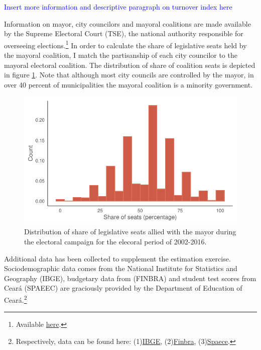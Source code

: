 \documentclass[12pt,a4paper]{article}
\newcommand{\blue}{\textcolor{blue}}
\begin{document}
\blue{Insert more information and descriptive paragraph on turnover index here}

Information on mayor, city councilors and mayoral coalitions are made available by the Supreme Electoral Court (TSE), the national authority responsible for overseeing elections.\footnote{Available \hyperlink{http://www.tse.jus.br/eleicoes/estatisticas/repositorio-de-dados-eleitorais-1}{here}.} In order to calculate the share of legislative seats held by the mayoral coalition, I match the partisanship of each city councilor to the mayoral electoral coalition. The distribution of share of coalition seats is depicted in figure \ref{fig:hist_coalition}. Note that although most city councils are controlled by the mayor, in over 40 percent of municipalities the mayoral coalition is a minority government.

\begin{figure}
    \centering
    \includegraphics{plots/hist_coalition.pdf}
    \caption{Distribution of share of legislative seats allied with the mayor during the electoral campaign for the elecoral period of 2002-2016.}
    \label{fig:hist_coalition}
\end{figure}

Additional data has been collected to supplement the estimation exercise. Sociodemographic data comes from the National Institute for Statistics and Geography (IBGE), budgetary data from (FINBRA) and student test scores from Ceará (SPAEEC) are graciously provided by the Department of Education of Ceará.\footnote{Respectively, data can be found here: (1)\hyperlink{https://ces.ibge.gov.br/base-de-dados/links-base-de-dados.html}{IBGE}, (2)\hyperlink{https://siconfi.tesouro.gov.br/siconfi/pages/public/consulta_finbra/finbra_list.jsf}{Finbra}, (3)\hyperlink{https://www.seduc.ce.gov.br/spaece/}{Spaece}.}
\end{document}
